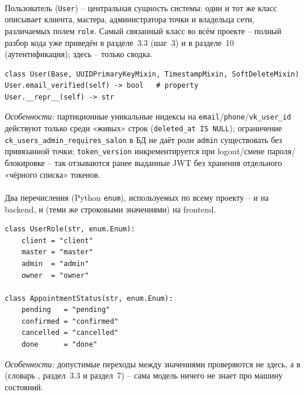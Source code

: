 \paragraph{}
Пользователь (\texttt{User}) -- центральная сущность системы: один и тот
же класс описывает клиента, мастера, администратора точки и владельца
сети, различаемых полем \texttt{role}. Самый связанный класс во всём
проекте -- полный разбор кода уже приведён в разделе~3.3 (шаг~3) и в
разделе~10 (аутентификация); здесь -- только сводка.
\begin{verbatim}
class User(Base, UUIDPrimaryKeyMixin, TimestampMixin, SoftDeleteMixin)
User.email_verified(self) -> bool   # property
User.__repr__(self) -> str
\end{verbatim}
\textit{Особенности:} партиционные уникальные индексы на
\texttt{email}/\texttt{phone}/\texttt{vk_user_id} действуют только
среди «живых» строк (\texttt{deleted_at IS NULL}); ограничение
\texttt{ck_users_admin_requires_salon} в БД не даёт роли
\texttt{admin} существовать без привязанной точки; \texttt{token_version}
инкрементируется при logout/смене пароля/блокировке -- так отзываются
ранее выданные JWT без хранения отдельного «чёрного списка» токенов.

\paragraph{}
Два перечисления (Python \texttt{enum}), используемых по всему проекту --
и на backend, и (теми же строковыми значениями) на frontend.
\begin{verbatim}
class UserRole(str, enum.Enum):
    client = "client"
    master = "master"
    admin  = "admin"
    owner  = "owner"

class AppointmentStatus(str, enum.Enum):
    pending   = "pending"
    confirmed = "confirmed"
    cancelled = "cancelled"
    done      = "done"
\end{verbatim}
\textit{Особенности:} допустимые переходы между значениями
 проверяются не здесь, а в
 (словарь , раздел~3.3
и раздел~7) -- сама модель ничего не знает про машину состояний.

